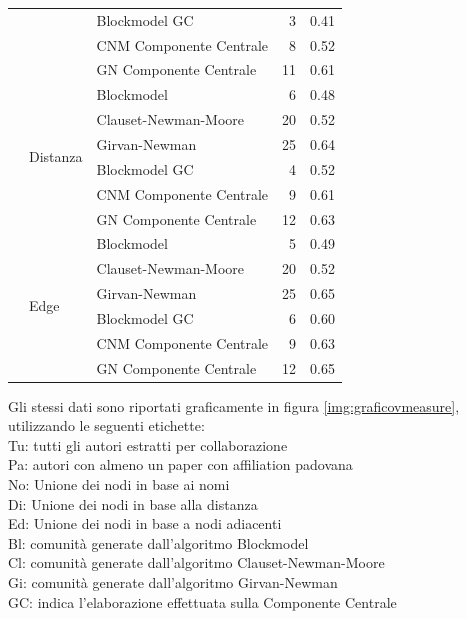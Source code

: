 \documentclass[12pt,a4paper,twoside]{report}
\begin{document}
{\begin{center}
\begin{longtable}{ |l|l|l|r|r| }
        &&Blockmodel GC  &3&0.41\\
        &&CNM Componente Centrale  &8&0.52\\
        &&GN Componente Centrale  &11&0.61\\
    \cline{2-5}
        &
        \multirow{6}{4em}{Distanza}
        &Blockmodel &6&0.48\\
        &&Clauset-Newman-Moore &20&0.52\\
        &&Girvan-Newman &25&0.64\\
        &&Blockmodel GC  &4&0.52\\
        &&CNM Componente Centrale  &9&0.61\\
        &&GN Componente Centrale  &12&0.63\\
    \cline{2-5}
        &
        \multirow{6}{4em}{Edge}
        &Blockmodel &5&0.49\\
        &&Clauset-Newman-Moore &20&0.52\\
        &&Girvan-Newman &25&0.65\\
        &&Blockmodel GC  &6&0.60\\
        &&CNM Componente Centrale  &9&0.63\\
        &&GN Componente Centrale  &12&0.65\\
    \hline
\end{longtable}
\end{center}
}

Gli stessi dati sono riportati graficamente in figura \ref{img:graficovmeasure}, utilizzando le
seguenti etichette:\\
Tu: tutti gli autori estratti per collaborazione\\
Pa: autori con almeno un paper con affiliation padovana\\
No: Unione dei nodi in base ai nomi\\
Di: Unione dei nodi in base alla distanza\\
Ed: Unione dei nodi in base a nodi adiacenti\\
Bl: comunità generate dall'algoritmo Blockmodel\\
Cl: comunità generate dall'algoritmo Clauset-Newman-Moore\\
Gi: comunità generate dall'algoritmo Girvan-Newman\\
GC: indica l'elaborazione effettuata sulla Componente Centrale
\end{document}
